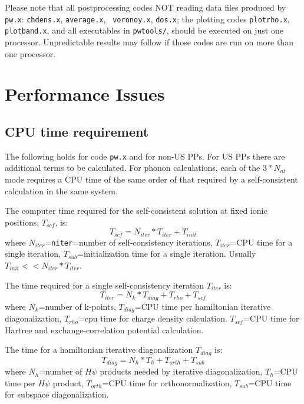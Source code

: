 \documentclass[12pt]{article}
\begin{document}
Please note that all postprocessing codes NOT reading data files
produced by {\tt pw.x}: {\tt chdens.x}, {\tt average.x}, {\tt
voronoy.x}, {\tt dos.x}; the plotting codes {\tt plotrho.x}, {\tt
plotband.x}, and all executables in {\tt pwtools/}, should be executed
on just one processor. Unpredictable results may follow if those codes
are run on more than one processor.
\newpage

\section{Performance Issues}

\subsection{CPU time requirement}

The following holds for code {\tt pw.x} and for non-US PPs. 
For US PPs there are additional terms to be calculated.
For phonon calculations, each of the $3*N_{at}$ mode requires
a CPU time of the same order of that required by a self-consistent 
calculation in the same system.

The computer time required for the self-consistent solution at fixed
ionic positions, $T_{scf}$, is:
\begin{equation}
T_{scf} =N_{iter}*T_{iter} + T_{init}\nonumber
\end{equation}
where $N_{iter}$={\tt niter}=number of self-consistency iterations,
$T_{iter}$=CPU time for a single iteration,
$T_{sub}$=initialization time for a single iteration. 
Usually $T_{init} << N_{iter}*T_{iter}$.

The time required for a single self-consistency iteration
$T_{iter}$ is:
\begin{equation}
T_{iter}=N_k*T_{diag} + T_{rho} + T_{scf}
\end{equation}
where $N_k$=number of k-points, $T_{diag}$=CPU time per hamiltonian iterative 
diagonalization, $T_{rho}$=cpu time for charge density calculation.
$T_{scf}$=CPU time for Hartree and exchange-correlation potential calculation.

The time for a hamiltonian iterative diagonalization $T_{diag}$ is:
\begin{equation}
      T_{diag}= N_h*T_h + T_{orth} + T_{sub}
\end{equation}
where $N_h$=number  of $H\psi$ products needed by iterative diagonalization,
$T_h$=CPU time per $H\psi$ product, $T_{orth}$=CPU time for orthonormalization,
$T_{sub}$=CPU time for subspace diagonalization.
\end{document}
